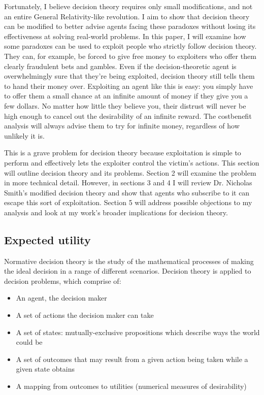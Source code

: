 \documentclass{article}
\begin{document}
Fortunately, I believe decision theory requires only small modifications, and not an entire General Relativity-like revolution. I aim to show that decision theory can be modified to better advise agents facing these paradoxes without losing its effectiveness at solving real-world problems. In this paper, I will examine how some paradoxes can be used to exploit people who strictly follow decision theory. They can, for example, be forced to give free money to exploiters who offer them clearly fraudulent bets and gambles. Even if the decision-theoretic agent is overwhelmingly sure that they're being exploited, decision theory still tells them to hand their money over. Exploiting an agent like this is easy: you simply have to offer them a small chance at an infinite amount of money if they give you a few dollars. No matter how little they believe you, their distrust will never be high enough to cancel out the desirability of an infinite reward. The cost{\textemdash}benefit analysis will always advise them to try for infinite money, regardless of how unlikely it is.

This is a grave problem for decision theory because exploitation is simple to perform and effectively lets the exploiter control the victim's actions. This section will outline decision theory and its problems. Section 2 will examine the problem in more technical detail. However, in sections 3 and 4 I will review Dr. Nicholas Smith's modified decision theory \citep{smith2014evaluative} and show that agents who subscribe to it can escape this sort of exploitation. Section 5 will address possible objections to my analysis and look at my work's broader implications for decision theory.

\subsection{Expected utility}
Normative decision theory is the study of the mathematical processes of making the ideal decision in a range of different scenarios. Decision theory is applied to decision problems, which comprise of:

\begin{itemize}  
\item An agent, the decision maker
\item A set of actions the decision maker can take
\item A set of states: mutually-exclusive propositions which describe ways the world could be
\item A set of outcomes that may result from a given action being taken while a given state obtains
\item A mapping from outcomes to utilities (numerical measures of desirability)
\end{itemize}
\end{document}
